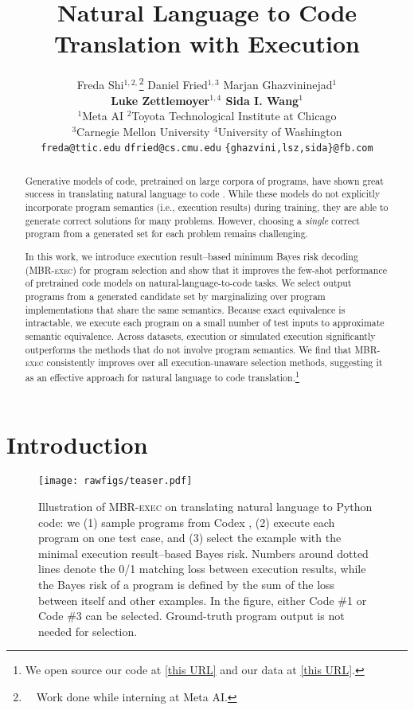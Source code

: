 \documentclass[11pt]{article}
\title{Natural Language to Code Translation with Execution}
\author{
Freda Shi$^{1, 2, }$\thanks{~~Work done while interning at Meta AI.} \quad
Daniel Fried$^{1, 3}$  \quad
Marjan Ghazvininejad$^{1}$
\\
\textbf{Luke Zettlemoyer$^{1, 4}$ \quad
Sida I. Wang$^{1}$}
\\
$^1$Meta AI \quad $^2$Toyota Technological Institute at Chicago \\
$^3$Carnegie Mellon University \quad $^4$University of Washington\\
\texttt{freda@ttic.edu} \quad \texttt{dfried@cs.cmu.edu} \quad \texttt{\{ghazvini,lsz,sida\}@fb.com}
}
\newcommand{\interalia}[1]{\citep[\textit{inter alia}]{#1}}
\newcommand{\mbrexec}{\textsc{MBR-exec}\xspace}
\begin{document}
\maketitle
{}
\begin{abstract}
    Generative models of code, pretrained on large corpora of programs, have shown great success in translating natural language to code \interalia{chen2021evaluating,austin2021program,li2022competition}.
    While these models do not explicitly incorporate program semantics (i.e., execution results) during training, they are able to generate correct solutions for many problems. 
    However, choosing a \emph{single} correct program from a generated set for each problem remains challenging.

    In this work, we introduce execution result--based minimum Bayes risk decoding (\mbrexec) for program selection and show that it improves the few-shot performance of pretrained code models on natural-language-to-code tasks. We select output programs from a generated candidate set by marginalizing over program implementations that share the same semantics. Because exact equivalence is intractable, we execute each program on a small number of test inputs to approximate semantic equivalence. Across datasets, execution or simulated execution significantly outperforms the methods that do not involve program semantics. We find that \mbrexec consistently improves over all execution-unaware selection methods, suggesting it as an effective approach for natural language to code translation.\footnote{We open source our code at \href{https://github.com/facebookresearch/mbr-exec}{\textcolor{airforceblue}{[this URL]}} and our data at \href{https://dl.fbaipublicfiles.com/mbr-exec/mbr-exec-release.zip}{\textcolor{airforceblue}{[this URL]}}.}
\end{abstract} \section{Introduction}
\label{sec:intro}
\begin{figure}[t]
    \centering
    \texttt{[image: rawfigs/teaser.pdf]}
    \caption{Illustration of \mbrexec on translating natural language to Python code: we (1) sample programs from Codex \citep{chen2021evaluating}, (2) execute each program on one test case, and (3) select the example with the minimal execution result--based Bayes risk. 
    Numbers around dotted lines denote the 0/1 matching loss between execution results, while the Bayes risk of a program is defined by the sum of the loss between itself and other examples. 
    In the figure, either Code \#1 or Code \#3 can be selected. Ground-truth program output is not needed for selection.} 
    \label{fig:teaser}
\end{figure}
\end{document}
